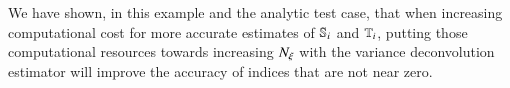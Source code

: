 We have shown, in this example and the analytic test case, that when increasing computational cost for more accurate estimates of $\S{i}$ and $\T{i}$, putting those computational resources towards increasing $\Nxi$ with the variance deconvolution estimator will improve the accuracy of indices that are not near zero.